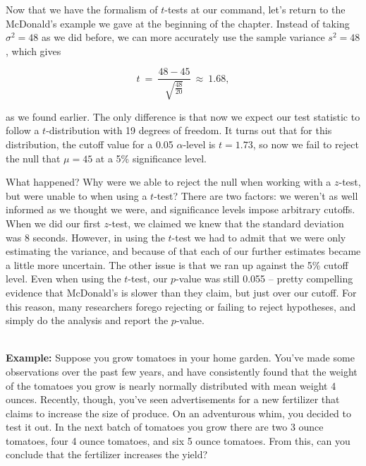Now that we have the formalism of $t$-tests at our command, let's return to the McDonald's example we gave at the beginning of the chapter. Instead of taking $\sigma^{2}=48$ as we did before, we can more accurately use the sample variance $s^{2}=48$, which gives

\begin{equation*}

t\ = \ \frac{48-45}{\sqrt{\frac{48}{20}}}\ \approx \ 1.68,

\end{equation*}

as we found earlier. The only difference is that now we expect our test statistic to follow a $t$-distribution with 19 degrees of freedom. It turns out that for this distribution, the cutoff value for a 0.05 $\alpha$-level is $t=1.73$, so now we fail to reject the null that $\mu=45$ at a 5\% significance level.



What happened? Why were we able to reject the null when working with a $z$-test, but were unable to when using a $t$-test? There are two factors: we weren't as well informed as we thought we were, and significance levels impose arbitrary cutoffs. When we did our first $z$-test, we claimed we knew that the standard deviation was 8 seconds. However, in using the $t$-test we had to admit that we were only estimating the variance, and because of that each of our further estimates became a little more uncertain. The other issue is that we ran up against the 5\% cutoff level. Even when using the $t$-test, our $p$-value was still 0.055 -- pretty compelling evidence that McDonald's is slower than they claim, but just over our cutoff. For this reason, many researchers forego rejecting or failing to reject hypotheses, and simply do the analysis and report the $p$-value.



\ \\



\textbf{Example:} \ex Suppose you grow tomatoes in your home garden.  You've made some observations over the past few years, and have consistently found that the weight of the tomatoes you grow is nearly normally distributed with mean weight 4 ounces.  Recently, though, you've seen advertisements for a new fertilizer that claims to increase the size of produce.  On an adventurous whim, you decided to test it out.  In the next batch of tomatoes you grow there are two 3 ounce tomatoes, four 4 ounce tomatoes, and six 5 ounce tomatoes.  From this, can you conclude that the fertilizer increases the yield?



